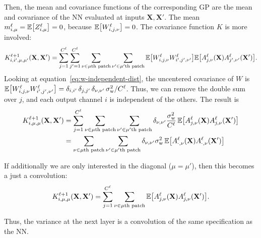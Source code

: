 \documentclass{article}
\theoremstyle{definition}
\newcommand{\vX}{\mathbf{X}}
\newcommand{\patchfun}[1]{{#1}\text{th patch}}
\newcommand{\bracket}[3]{{\left#1 #3 \right#2}}
\newcommand{\bra}{\bracket{(}{)}}
\newcommand{\sqb}{\bracket{[}{]}}
\newcommand{\ssup}[1]{^{#1}}
\begin{document}
Then, the mean and covariance functions of the corresponding GP are the mean and covariance of the NN evaluated at inputs $\vX, \vX'$. The mean $m\ssup{\ell}_{i,\mu} = \ExpSymb\sqb{Z\ssup{\ell}_{i,\mu}} = 0$, because $\ExpSymb\sqb{W\ssup{\ell}_{i,j,\nu}}=0$. The covariance function $K$ is more involved:
\begin{equation}
    K\ssup{\ell+1}_{i,i',\mu,\mu'}(\vX, \vX') %
    = \sum_{j=1}^{C\ssup{\ell}} \sum_{j'=1}^{C\ssup{\ell}} \sum_{\nu \in \patchfun{\mu}} \sum_{\nu' \in \patchfun{\mu'}} \ExpSymb\sqb{
    W\ssup{\ell}_{i,j,\nu} W\ssup{\ell}_{i',j',\nu'}} \ExpSymb\sqb{A\ssup{\ell}_{j,\nu}(\vX) A\ssup{\ell}_{j',\nu'}(\vX')}.
  \label{eq:cov-independent}
\end{equation}
Looking at equation~\cref{eq:w-independent-dist}, the uncentered covariance of $W$ is $\ExpSymb\sqb{W\ssup{\ell}_{i,j,\nu}W\ssup{\ell}_{i',j',\nu'}} = \delta_{i,i'} \, \delta_{j, j'} \, \delta_{\nu, \nu'}\, \sigma_\text{w}^2/C\ssup{\ell}$. Thus, we can remove the double sum over $j$, and each output channel $i$ is independent of the others. The result is 
\begin{align}
    K\ssup{\ell+1}_{i,\mu,\mu}(\vX, \vX') %
    &= \sum_{j=1}^{C\ssup{\ell}} \sum_{\nu \in \patchfun{\mu}} \sum_{\nu' \in \patchfun{\mu'}} \delta_{\nu,\nu'} \frac{\sigma^2_\text{w}}{C\ssup{\ell}}\,
    \ExpSymb\sqb{A\ssup{\ell}_{j,\nu}(\vX) A\ssup{\ell}_{j,\nu}(\vX')} \\
    &= \sum_{\nu \in \patchfun{\mu}} \sum_{\nu' \in \patchfun{\mu'}} \delta_{\nu,\nu'} \sigma^2_\text{w}\,
      \ExpSymb\sqb{A\ssup{\ell}_{\cdot,\nu}(\vX) A\ssup{\ell}_{\cdot,\nu}(\vX')} 
\end{align}

If additionally we are only interested in the diagonal ($\mu=\mu'$), then this
becomes a just a convolution:
\begin{equation*}
    K\ssup{\ell+1}_{i,\mu,\mu}(\vX, \vX') %
    = \sum_{j=1}^{C\ssup{\ell}} \sum_{\nu \in \patchfun{\mu}}  \ExpSymb\sqb{A\ssup{\ell}_{j,\nu}(\vX) A\ssup{\ell}_{j,\nu}(\vX')}.
\end{equation*}

Thus, the variance at the next layer is a convolution of the same specification as the NN.
\end{document}
